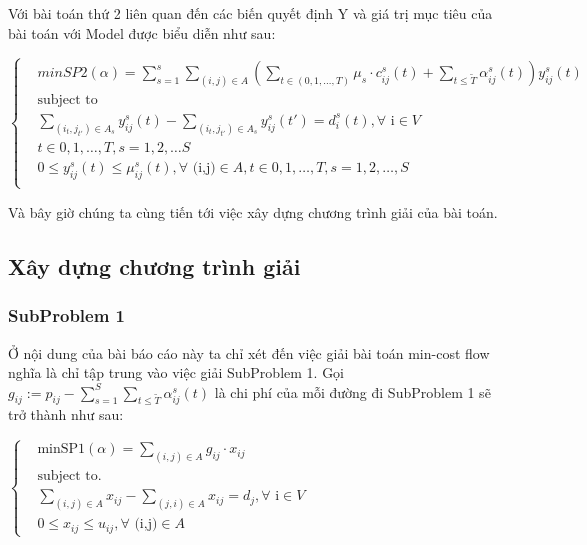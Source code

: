 \documentclass[a4paper]{article}
\begin{document}
Với bài toán thứ 2 liên quan đến các biến quyết định Y và giá trị mục tiêu của bài toán với Model được biểu diễn như sau:
  \begin{center}
$ \begin{cases}
& minSP2(\alpha) = \sum_{s=1}^s \sum_{(i,j)\in A}(\sum_{t\in(0,1,\dots , T)} \mu_s \cdot c_{ij}^s (t) + \sum_{t \leqslant \tilde{T}} \alpha_{ij}^s (t) ) y_{ij}^s (t) \\
& \text{subject to} \\
& \sum_{(i_t,j_{t'})\in A_s} y_{ij}^s (t) - \sum_{(i_t,j_{t'})\in A_s} y_{ij}^s (t') = d_i^s (t) , \forall \text{ i} \in V\\
 & t\in {0,1,\dots , T} , s= 1,2,\dots S \\
 & 0 \leqslant y_{ij}^s (t) \leqslant \mu_{ij} ^ s (t), \forall \text{ (i,j)} \in A, t \in {0,1,\dots, T}, s=1,2,\dots , S \\
\end{cases}$
\end{center}
 Và bây giờ chúng ta cùng tiến tới việc xây dựng chương trình giải của bài toán.
\subsection{Xây dựng chương trình giải}
\subsubsection{SubProblem 1}
Ở nội dung của bài báo cáo này ta chỉ xét đến việc giải bài toán min-cost flow nghĩa là chỉ tập trung vào việc giải SubProblem 1. Gọi $g_{ij} := p_{ij} - \sum_{s=1}^S \sum_{t\leq \tilde{T}} \alpha^{s}_{ij}(t)$ là chi phí của mỗi đường đi SubProblem 1 sẽ trở thành như sau:
\begin{center}
$ \begin{cases}
&\text{minSP1}( \alpha) = \sum_{(i,j)\in A} g_{ij}\cdot x_{ij}\\
& \text{subject to.}\\
& \sum_{(i,j)\in A} x_{ij} - \sum_{(j,i) \in A} x_{ij} = d_j , \forall \text{ i} \in V \\
& 0 \leqslant x_{ij} \leqslant u_{ij}, \forall \text { (i,j)} \in A
    
\end{cases}$
\end{center}
\end{document}
